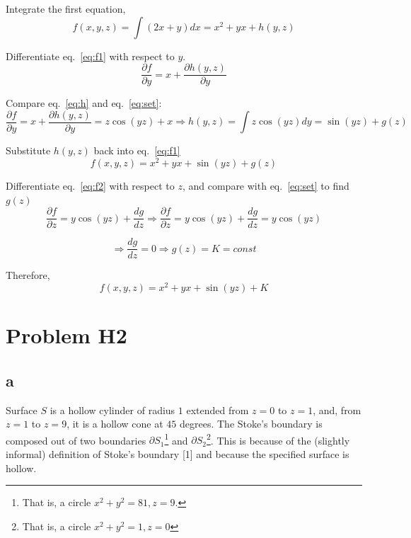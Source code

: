 \documentclass{article}
\begin{document}
Integrate the first equation,
\begin{equation} \label{eq:f1}
  f(x, y, z) = \int (2x + y) dx = x^2 + yx + h(y, z)  
\end{equation}

Differentiate eq.~\eqref{eq:f1} with respect to $y$.
\begin{equation} \label{eq:h}
  \frac{\partial f}{\partial y} = x + \frac{\partial h(y,z)}{\partial y}
\end{equation}

Compare eq.~\eqref{eq:h} and eq.~\eqref{eq:set}:
\begin{equation*}
  \frac{\partial f}{\partial y} = x + \frac{\partial h(y,z)}{\partial y} = z\cos(yz) + x \Rightarrow h(y, z) = \int z\cos(yz) dy = \sin(yz) + g(z)
\end{equation*}

Substitute $h(y, z)$ back into eq.~\eqref{eq:f1}
\begin{equation} \label{eq:f2}
  f(x, y, z) = x^2 + yx + \sin(yz) + g(z)
\end{equation}

Differentiate eq.~\eqref{eq:f2} with respect to $z$, and compare with eq.~\eqref{eq:set} to find $g(z)$
\begin{equation*}
  \frac{\partial f}{\partial z} = y\cos(yz) + \frac{dg}{dz} \Rightarrow \frac{\partial f}{\partial z} = y\cos(yz) + \frac{dg}{dz} = y\cos(yz)
\end{equation*}

\begin{equation*}
  \Rightarrow \frac{dg}{dz} = 0 \Rightarrow g(z) = K = const
\end{equation*}

Therefore,
\begin{equation*}
  f(x, y, z) = x^2 + yx + \sin(yz) + K
\end{equation*}

\section{Problem H2}

\subsection{a}
Surface $S$ is a hollow cylinder of radius $1$ extended from $z = 0$ to $z = 1$, and, from $z = 1$ to $z = 9$, it is a hollow cone at $45$ degrees. The Stoke's boundary is composed out of two boundaries $\partial S_1$\footnote{That is, a circle $x^2 + y^2 = 81, z=9$.} and $\partial S_2$\footnote{That is, a circle $x^2 + y^2 = 1, z=0$}. This is because of the (slightly informal) definition of Stoke's boundary [1] and because the specified surface is hollow.
\end{document}
